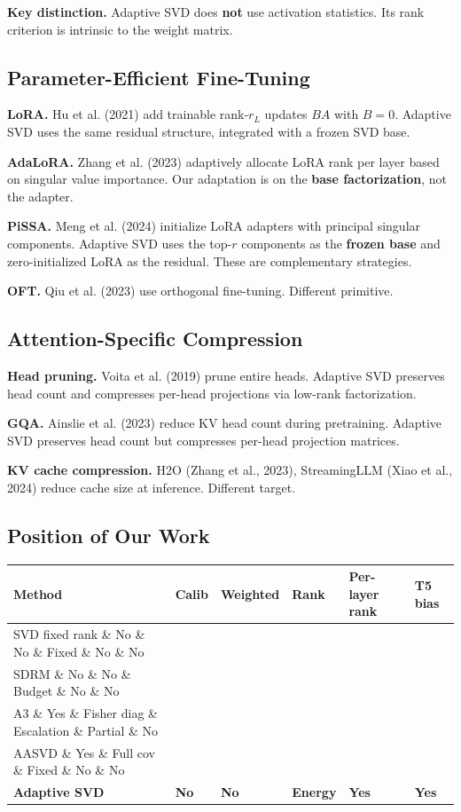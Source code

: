 \textbf{Key distinction.} Adaptive SVD does \textbf{not} use activation statistics. Its 
rank criterion is intrinsic to the weight matrix.

\subsection{Parameter-Efficient Fine-Tuning}

\textbf{LoRA.} Hu et al. (2021) add trainable rank-$r_L$ updates $B A$ with $B = 0$. 
Adaptive SVD uses the same residual structure, integrated with a frozen SVD base.

\textbf{AdaLoRA.} Zhang et al. (2023) adaptively allocate LoRA rank per layer based 
on singular value importance. Our adaptation is on the \textbf{base factorization}, 
not the adapter.

\textbf{PiSSA.} Meng et al. (2024) initialize LoRA adapters with principal singular 
components. Adaptive SVD uses the top-$r$ components as the \textbf{frozen base} 
and zero-initialized LoRA as the residual. These are complementary strategies.

\textbf{OFT.} Qiu et al. (2023) use orthogonal fine-tuning. Different primitive.

\subsection{Attention-Specific Compression}

\textbf{Head pruning.} Voita et al. (2019) prune entire heads. Adaptive SVD preserves 
head count and compresses per-head projections via low-rank factorization.

\textbf{GQA.} Ainslie et al. (2023) reduce KV head count during pretraining. Adaptive 
SVD preserves head count but compresses per-head projection matrices.

\textbf{KV cache compression.} H2O (Zhang et al., 2023), StreamingLLM (Xiao et al., 
2024) reduce cache size at inference. Different target.

\subsection{Position of Our Work}

\begin{table}[H]
\centering
\small
\begin{tabular}{llllll}
\toprule
\textbf{Method} & \textbf{Calib} & \textbf{Weighted} & \textbf{Rank} & \textbf{Per-layer rank} & \textbf{T5 bias} \\
\midrule
SVD fixed rank \& No \& No \& Fixed \& No \& No \\
SDRM \& No \& No \& Budget \& No \& No \\
A3 \& Yes \& Fisher diag \& Escalation \& Partial \& No \\
AASVD \& Yes \& Full cov \& Fixed \& No \& No \\
\textbf{Adaptive SVD} & \textbf{No} & \textbf{No} & \textbf{Energy} & \textbf{Yes} & \textbf{Yes} \\
\bottomrule
\end{tabular}
\end{table}

